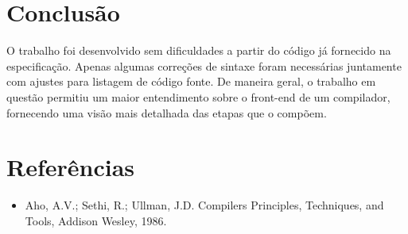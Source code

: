 \documentclass[a4paper,12pt]{report}
\begin{document}
\section{Conclusão}

O trabalho foi desenvolvido sem dificuldades a partir do código já fornecido na especificação. Apenas algumas
correções de sintaxe foram necessárias juntamente com ajustes para listagem de código fonte. De maneira geral,
o trabalho em questão permitiu um maior entendimento sobre o front-end de um compilador, fornecendo uma visão
mais detalhada das etapas que o compõem.

\section{Referências}

\begin{itemize}
 \item Aho, A.V.; Sethi, R.; Ullman, J.D. Compilers Principles, Techniques, and
 Tools, Addison Wesley, 1986.
\end{itemize}
\end{document}
